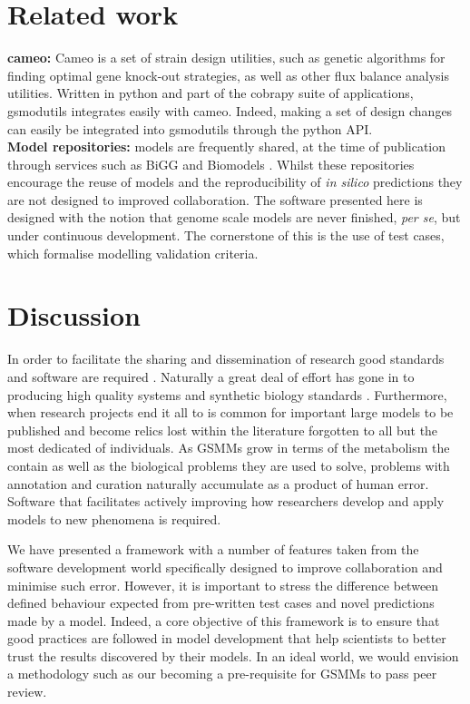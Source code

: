 \documentclass[a4paper,10pt]{article}
\begin{document}
\section{Related work}
\textbf{cameo:} Cameo \cite{cardoso2017cameo} is a set of strain design utilities, such as genetic algorithms for finding optimal gene knock-out
strategies, as well as other flux balance analysis utilities. Written in python and part of the cobrapy suite of applications,
gsmodutils integrates easily with cameo.
Indeed, making a set of design changes can easily be integrated into gsmodutils through the python API.
\\
\textbf{Model repositories:} models are frequently shared, at the time of publication through services such as BiGG \cite{king2015bigg} and Biomodels \cite{chelliah2013biomodels}. 
Whilst these repositories encourage the reuse of models and the reproducibility of \textit{in silico} predictions they are not designed to improved collaboration.
The software presented here is designed with the notion that genome scale models are never finished, \textit{per se}, but under continuous development.
The cornerstone of this is the use of test cases, which formalise modelling validation criteria.


\section{Discussion}
In order to facilitate the sharing and dissemination of research good standards and software are required \cite{}.
Naturally a great deal of effort has gone in to producing high quality systems and synthetic biology standards \cite{}.
Furthermore, when research projects end it all to is common for important large models to be published and become relics lost within the literature forgotten to all but the most dedicated of individuals.
As GSMMs grow in terms of the metabolism the contain as well as the biological problems they are used to solve, problems with annotation and curation naturally accumulate as a product of human error.
Software that facilitates actively improving how researchers develop and apply models to new phenomena is required.

We have presented a framework with a number of features taken from the software development world specifically designed to improve collaboration and minimise such error.
However, it is important to stress the difference between defined behaviour expected from pre-written test cases and novel predictions made by a model.
Indeed, a core objective of this framework is to ensure that good practices are followed in model development that help scientists to better trust the results discovered by their models.
In an ideal world, we would envision a methodology such as our becoming a pre-requisite for GSMMs to pass peer review.
\end{document}
